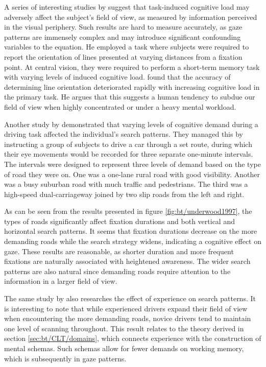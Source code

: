 A series of interesting studies by \textcite{williams1982, williams1985, williams1988} suggest that task-induced cognitive load may adversely affect the subject's field of view, as measured by information perceived in the visual periphery. Such results are hard to measure accurately, as gaze patterns are immensely complex and may introduce significant confounding variables to the equation. He employed a task where subjects were required to report the orientation of lines presented at varying distances from a fixation point. At central vision, they were required to perform a short-term memory task with varying levels of induced cognitive load. \textcite{williams1985} found that the accuracy of determining line orientation deteriorated rapidly with increasing cognitive load in the primary task. He argues that this suggests a human tendency to subdue our field of view when highly concentrated or under a heavy mental workload.

Another study by \textcite{underwood1997} demonstrated that varying levels of cognitive demand during a driving task affected the individual's search patterns. They managed this by instructing a group of subjects to drive a car through a set route, during which their eye movements would be recorded for three separate one-minute intervals. The intervals were designed to represent three levels of demand based on the type of road they were on. One was a one-lane rural road with good visibility. Another was a busy suburban road with much traffic and pedestrians. The third was a high-speed dual-carriageway joined by two slip roads from the left and right. 

As can be seen from the results presented in figure \ref{fig:bt/underwood1997}, the types of roads significantly affect fixation durations and both vertical and horizontal search patterns. It seems that fixation durations decrease on the more demanding roads while the search strategy widens, indicating a cognitive effect on gaze. These results are reasonable, as shorter duration and more frequent fixations are naturally associated with heightened awareness. The wider search patterns are also natural since demanding roads require attention to the information in a larger field of view.

The same study by \textcite{underwood1997} also researches the effect of experience on search patterns. 
It is interesting to note that while experienced drivers expand their field of view when encountering the more demanding roads, novice drivers tend to maintain one level of scanning throughout. 
This result relates to the theory derived in section \ref{sec:bt/CLT/domains}, which connects experience with the construction of mental schemas. Such schemas allow for fewer demands on working memory, which is subsequently in gaze patterns.

